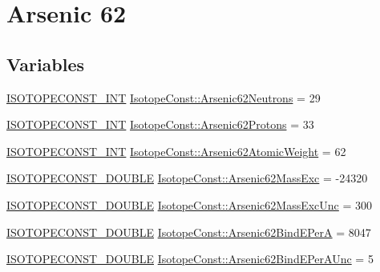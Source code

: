 \hypertarget{group___isotope_const-_arsenic-_as62}{}\section{Arsenic 62}
\label{group___isotope_const-_arsenic-_as62}
\subsection*{Variables}
\begin{DoxyCompactItemize}
\item 
\mbox{\hyperlink{group___isotope_const-_macros_ga5f18360b3e99483a35c32d789e62621c}{I\+S\+O\+T\+O\+P\+E\+C\+O\+N\+S\+T\+\_\+\+I\+NT}} \mbox{\hyperlink{group___isotope_const-_arsenic-_as62_gaa9d9f87e581c96dd87c07c8afa5a264b}{Isotope\+Const\+::\+Arsenic62\+Neutrons}} = 29
\item 
\mbox{\hyperlink{group___isotope_const-_macros_ga5f18360b3e99483a35c32d789e62621c}{I\+S\+O\+T\+O\+P\+E\+C\+O\+N\+S\+T\+\_\+\+I\+NT}} \mbox{\hyperlink{group___isotope_const-_arsenic-_as62_gae050457fd05cebffdc014c7798f54460}{Isotope\+Const\+::\+Arsenic62\+Protons}} = 33
\item 
\mbox{\hyperlink{group___isotope_const-_macros_ga5f18360b3e99483a35c32d789e62621c}{I\+S\+O\+T\+O\+P\+E\+C\+O\+N\+S\+T\+\_\+\+I\+NT}} \mbox{\hyperlink{group___isotope_const-_arsenic-_as62_ga736885f50b32c3083297dd0e92371a53}{Isotope\+Const\+::\+Arsenic62\+Atomic\+Weight}} = 62
\item 
\mbox{\hyperlink{group___isotope_const-_macros_ga8f45a7272ce02c0b4c65c44636ed719a}{I\+S\+O\+T\+O\+P\+E\+C\+O\+N\+S\+T\+\_\+\+D\+O\+U\+B\+LE}} \mbox{\hyperlink{group___isotope_const-_arsenic-_as62_ga799cbf34c8fa6ff73e2d3565a8cd40ca}{Isotope\+Const\+::\+Arsenic62\+Mass\+Exc}} = -\/24320
\item 
\mbox{\hyperlink{group___isotope_const-_macros_ga8f45a7272ce02c0b4c65c44636ed719a}{I\+S\+O\+T\+O\+P\+E\+C\+O\+N\+S\+T\+\_\+\+D\+O\+U\+B\+LE}} \mbox{\hyperlink{group___isotope_const-_arsenic-_as62_gadc8087ef012c0191260d0f1e4e88a607}{Isotope\+Const\+::\+Arsenic62\+Mass\+Exc\+Unc}} = 300
\item 
\mbox{\hyperlink{group___isotope_const-_macros_ga8f45a7272ce02c0b4c65c44636ed719a}{I\+S\+O\+T\+O\+P\+E\+C\+O\+N\+S\+T\+\_\+\+D\+O\+U\+B\+LE}} \mbox{\hyperlink{group___isotope_const-_arsenic-_as62_ga9201511c1f6032752bd8579081a31a04}{Isotope\+Const\+::\+Arsenic62\+Bind\+E\+PerA}} = 8047
\item 
\mbox{\hyperlink{group___isotope_const-_macros_ga8f45a7272ce02c0b4c65c44636ed719a}{I\+S\+O\+T\+O\+P\+E\+C\+O\+N\+S\+T\+\_\+\+D\+O\+U\+B\+LE}} \mbox{\hyperlink{group___isotope_const-_arsenic-_as62_gaf7b6f58632b3b7f95321554ef40762a7}{Isotope\+Const\+::\+Arsenic62\+Bind\+E\+Per\+A\+Unc}} = 5

\end{DoxyCompactItemize}
